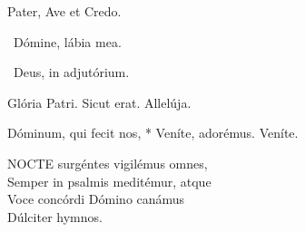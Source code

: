 



Pater, Ave et Credo.

\V\ Dómine, lábia mea.

\V\ Deus, in adjutórium.

Glória Patri. Sicut erat. Allelúja.


 Dóminum, qui fecit nos, * Veníte, adorémus.  Veníte.


\lettrine[lines=2]{N}{OCTE} surgéntes vigilémus omnes,\\
Semper in psalmis meditémur, atque\\
Voce concórdi Dómino canámus\\
Dúlciter hymnos.


